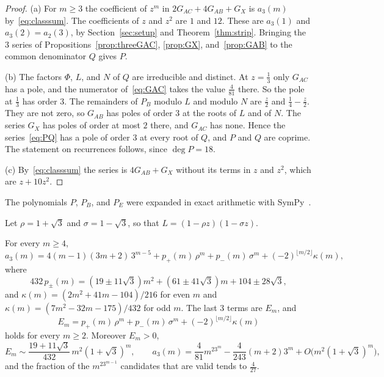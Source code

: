 \begin{proof}
(a) For $m\ge3$ the coefficient of $z^m$ in $2G_{AC}+4G_{AB}+G_X$ is $a_3(m)$
by~\eqref{eq:classsum}. The coefficients of $z$ and $z^2$ are $1$ and $12$.
These are $a_3(1)$ and $a_3(2)=a_2(3)$, by Section~\ref{sec:setup} and
Theorem~\ref{thm:strip}. Bringing the $3$ series of
Propositions~\ref{prop:threeGAC}, \ref{prop:GX}, and~\ref{prop:GAB} to the common
denominator $Q$ gives $P$.

(b) The factors $\Phi$, $L$, and $N$ of $Q$ are irreducible and distinct. At
$z=\frac13$ only $G_{AC}$ has a pole, and the numerator of~\eqref{eq:GAC} takes
the value $\frac4{81}$ there. So the pole at $\frac13$ has order $3$. The remainders of
$P_B$ modulo $L$ and modulo $N$ are $\frac z2$ and $\frac14-\frac z2$. They are
not zero, so $G_{AB}$ has poles of order $3$ at the roots of $L$ and of $N$.
The series $G_X$ has poles of order at most $2$ there, and $G_{AC}$ has none.
Hence the series~\eqref{eq:PQ} has a pole of order $3$ at every root of $Q$, and
$P$ and $Q$ are coprime. The statement on recurrences follows, since
$\deg P=18$.

(c) By~\eqref{eq:classsum} the series is $4G_{AB}+G_X$ without its terms in
$z$ and $z^2$, which are $z+10z^2$.
\end{proof}

The polynomials $P$, $P_B$, and $P_E$ were expanded in exact arithmetic with
SymPy~\cite{sympy2017}.

Let $\rho=1+\sqrt3$ and $\sigma=1-\sqrt3$, so that $L=(1-\rho z)(1-\sigma z)$.

\begin{theorem}\label{thm:threecount}
For every $m\ge4$,
\begin{equation}\label{eq:threecount}
a_3(m)=4(m-1)(3m+2)\,3^{m-5}+p_+(m)\,\rho^m+p_-(m)\,\sigma^m+(-2)^{\lfloor m/2\rfloor}\kappa(m),
\end{equation}
where
\[
432\,p_\pm(m)=(19\pm11\sqrt3)m^2+(61\pm41\sqrt3)m+104\pm28\sqrt3,
\]
and $\kappa(m)=(2m^2+41m-104)/216$ for even $m$ and
$\kappa(m)=(7m^2-32m-175)/432$ for odd $m$. The last $3$ terms are $E_m$, and
\begin{equation}\label{eq:Eclosed}
E_m=p_+(m)\,\rho^m+p_-(m)\,\sigma^m+(-2)^{\lfloor m/2\rfloor}\kappa(m)
\end{equation}
holds for every $m\ge2$. Moreover $E_m>0$,
\begin{equation}\label{eq:asymp1}
E_m\sim\frac{19+11\sqrt3}{432}\,m^2(1+\sqrt3)^m,\qquad
a_3(m)=\frac4{81}m^23^m-\frac4{243}(m+2)3^m+O\bigl(m^2(1+\sqrt3)^m\bigr),
\end{equation}
and the fraction of the $m^23^{m-1}$ candidates that are valid tends to
$\frac4{27}$.
\end{theorem}


